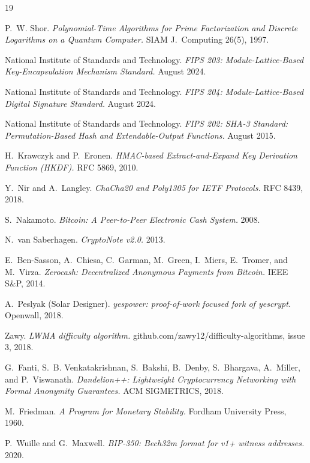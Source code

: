 \documentclass[11pt,a4paper]{article}
\begin{document}
\begin{thebibliography}{19}
\small

 P.~W. Shor.
\emph{Polynomial-Time Algorithms for Prime Factorization and Discrete
Logarithms on a Quantum Computer.} SIAM J.\ Computing 26(5), 1997.

 National Institute of Standards and Technology.
\emph{FIPS 203: Module-Lattice-Based Key-Encapsulation Mechanism Standard.}
August 2024.

 National Institute of Standards and Technology.
\emph{FIPS 204: Module-Lattice-Based Digital Signature Standard.}
August 2024.

 National Institute of Standards and Technology.
\emph{FIPS 202: SHA-3 Standard: Permutation-Based Hash and Extendable-Output
Functions.} August 2015.

 H.~Krawczyk and P.~Eronen.
\emph{HMAC-based Extract-and-Expand Key Derivation Function (HKDF).}
RFC 5869, 2010.

 Y.~Nir and A.~Langley.
\emph{ChaCha20 and Poly1305 for IETF Protocols.} RFC 8439, 2018.

 S.~Nakamoto.
\emph{Bitcoin: A Peer-to-Peer Electronic Cash System.} 2008.

 N.~van Saberhagen.
\emph{CryptoNote v2.0.} 2013.

 E.~Ben-Sasson, A.~Chiesa, C.~Garman, M.~Green, I.~Miers,
E.~Tromer, and M.~Virza.
\emph{Zerocash: Decentralized Anonymous Payments from Bitcoin.}
IEEE S\&P, 2014.

 A.~Peslyak (Solar Designer).
\emph{yespower: proof-of-work focused fork of yescrypt.} Openwall, 2018.

 Zawy.
\emph{LWMA difficulty algorithm.}
github.com/zawy12/difficulty-algorithms, issue 3, 2018.

 G.~Fanti, S.~B. Venkatakrishnan, S.~Bakshi, B.~Denby,
S.~Bhargava, A.~Miller, and P.~Viswanath.
\emph{Dandelion++: Lightweight Cryptocurrency Networking with Formal
Anonymity Guarantees.} ACM SIGMETRICS, 2018.

 M.~Friedman.
\emph{A Program for Monetary Stability.} Fordham University Press, 1960.

 P.~Wuille and G.~Maxwell.
\emph{BIP-350: Bech32m format for v1+ witness addresses.} 2020.


\end{thebibliography}
\end{document}
